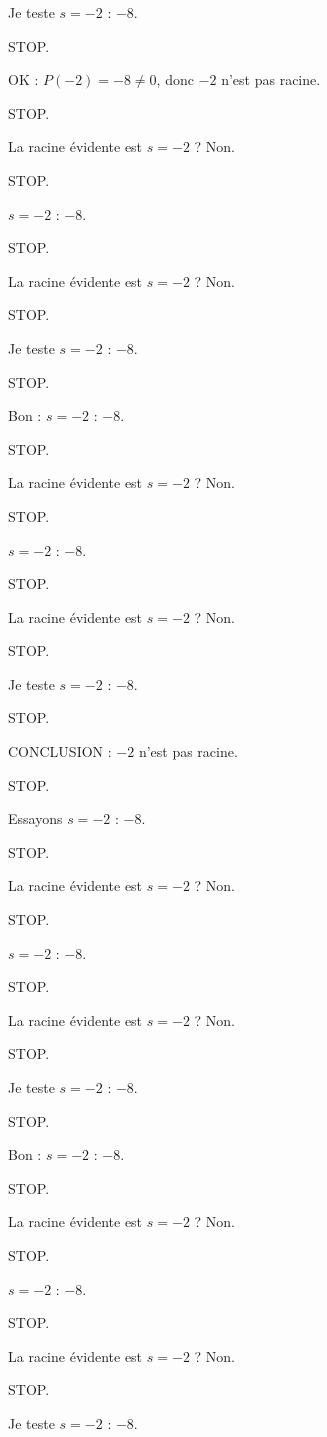 \documentclass[11pt]{article}
\begin{document}
\begin{exoresolu}
\begin{enumerate}
Je teste $s = -2$ : $-8$. 

STOP. 

OK : $P(-2) = -8 \neq 0$, donc $-2$ n'est pas racine. 

STOP. 

La racine évidente est $s = -2$ ? Non. 

STOP. 

$s = -2$ : $-8$. 

STOP. 

La racine évidente est $s = -2$ ? Non. 

STOP. 

Je teste $s = -2$ : $-8$. 

STOP. 

Bon : $s = -2$ : $-8$. 

STOP. 

La racine évidente est $s = -2$ ? Non. 

STOP. 

$s = -2$ : $-8$. 

STOP. 

La racine évidente est $s = -2$ ? Non. 

STOP. 

Je teste $s = -2$ : $-8$. 

STOP. 

CONCLUSION : $-2$ n'est pas racine. 

STOP. 

Essayons $s = -2$ : $-8$. 

STOP. 

La racine évidente est $s = -2$ ? Non. 

STOP. 

$s = -2$ : $-8$. 

STOP. 

La racine évidente est $s = -2$ ? Non. 

STOP. 

Je teste $s = -2$ : $-8$. 

STOP. 

Bon : $s = -2$ : $-8$. 

STOP. 

La racine évidente est $s = -2$ ? Non. 

STOP. 

$s = -2$ : $-8$. 

STOP. 

La racine évidente est $s = -2$ ? Non. 

STOP. 

Je teste $s = -2$ : $-8$. 


\end{enumerate}
\end{exoresolu}
\end{document}
